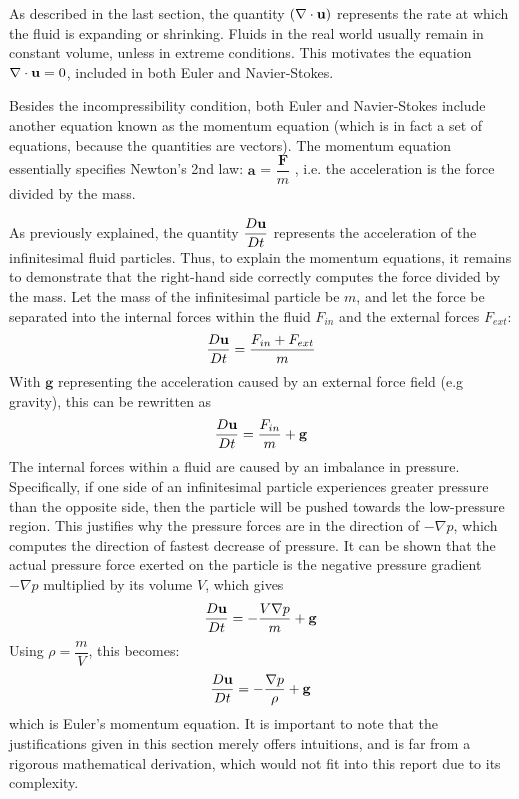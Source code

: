 As described in the last section, the quantity $(\nabla \cdot \textbf{u})$ represents the rate at which the fluid is expanding or shrinking. Fluids in the real world usually remain in constant volume, unless in extreme conditions. This motivates the equation $\nabla \cdot \textbf{u} = 0$, included in both Euler and Navier-Stokes.


Besides the incompressibility condition, both Euler and Navier-Stokes include another equation known as the momentum equation (which is in fact a set of equations, because the quantities are vectors). The momentum equation essentially specifies Newton's 2nd law: $\textbf{a}$ = $\dfrac{\textbf{F}}{m}$ , i.e. the acceleration is the force divided by the mass.

As previously explained, the quantity $\dfrac{D\textbf{u}}{Dt}$ represents the acceleration of the infinitesimal fluid particles. Thus, to explain the momentum equations, it remains to demonstrate that the right-hand side correctly computes the force divided by the mass. Let the mass of the infinitesimal particle be $m$, and let the force be separated into the internal forces within the fluid $F_{in}$ and the external forces $F_{ext}$:
$$
\dfrac{D\textbf{u}}{Dt} = \frac{F_{in} + F_{ext}}{m}
$$
With $\textbf{g}$ representing the acceleration caused by an external force field (e.g gravity), this can be rewritten as
$$
\dfrac{D\textbf{u}}{Dt} = \frac{F_{in}}{m} + \textbf{g}
$$
The internal forces within a fluid are caused by an imbalance in pressure. Specifically, if one side of an infinitesimal particle experiences greater pressure than the opposite side, then the particle will be pushed towards the low-pressure region. This justifies why the pressure forces are in the direction of $-\nabla p$, which computes the direction of fastest decrease of pressure. It can be shown that the actual pressure force exerted on the particle is the negative pressure gradient $-\nabla p$ multiplied by its volume $V$, which gives
$$
\dfrac{D\textbf{u}}{Dt} = -\frac{V \nabla p}{m} + \textbf{g}
$$
Using $\rho = \dfrac{m}{V}$, this becomes:
$$
\dfrac{D\textbf{u}}{Dt} =  -\frac{\nabla p}{\rho} + \textbf{g}
$$
which is Euler's momentum equation. It is important to note that the justifications given in this section merely offers intuitions, and is far from a rigorous mathematical derivation, which would not fit into this report due to its complexity. 


